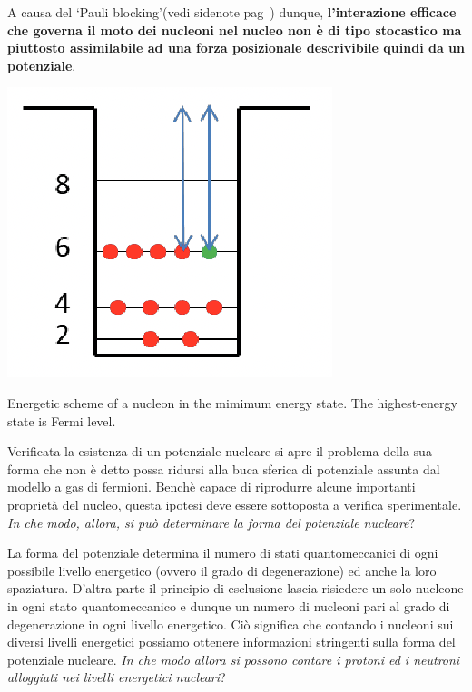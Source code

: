 A causa del `Pauli blocking’(vedi sidenote pag~\pageref{siden:pauli-blocking}) dunque, \textbf{l’interazione efficace che governa il moto dei nucleoni nel nucleo non è di tipo stocastico ma piuttosto assimilabile ad una forza posizionale descrivibile quindi da un potenziale}.
\bigskip
\begin{marginfigure}
	\includegraphics{figs/energy-level-shell1}
	\caption{Energetic scheme of a nucleon in the mimimum energy state. The highest-energy state is Fermi level.}
	\label{fig:energy-level-shell1}
\end{marginfigure}
Verificata la esistenza di un potenziale nucleare si apre il problema della sua forma che non è detto possa ridursi alla buca sferica di potenziale assunta dal modello a gas di fermioni.
Benchè capace di riprodurre alcune importanti proprietà del nucleo, questa ipotesi deve essere sottoposta a verifica sperimentale. \emph{In che modo, allora, si può determinare la forma del potenziale nucleare}?

La forma del potenziale determina il numero di stati quantomeccanici di ogni possibile livello energetico (ovvero il grado di degenerazione) ed anche la loro spaziatura.
D’altra parte il principio di esclusione lascia risiedere un solo nucleone in ogni stato quantomeccanico e dunque un numero di nucleoni pari al grado di degenerazione in ogni livello energetico.
Ciò significa che contando i nucleoni sui diversi livelli energetici possiamo ottenere informazioni stringenti sulla forma del potenziale nucleare. \emph{In che modo allora si possono contare i protoni ed i neutroni alloggiati nei livelli energetici nucleari}?

